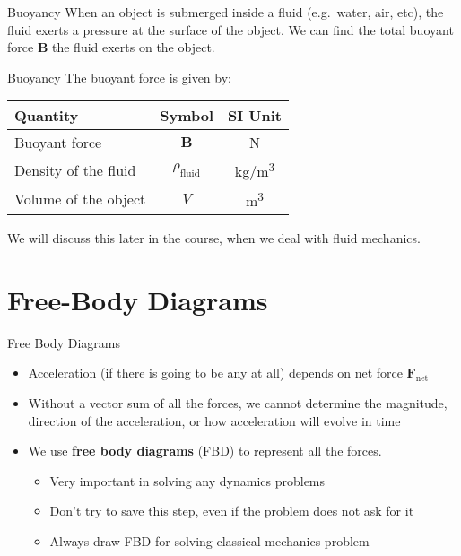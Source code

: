 \documentclass[12pt,compress,aspectratio=169]{beamer}
\begin{document}
\begin{frame}{Buoyancy}
  When an object is submerged inside a fluid (e.g.\ water, air, etc), the fluid
  exerts a pressure at the surface of the object. We can find the total buoyant 
  force $\bm{B}$ the fluid exerts on the object.
  \begin{center}
  \end{center}
\end{frame}



\begin{frame}{Buoyancy}
  The buoyant force is given by:
  
  \begin{center}
    \begin{tabular}{l|c|c}
      \rowcolor{pink}
      \textbf{Quantity} & \textbf{Symbol} & \textbf{SI Unit} \\ \hline
      Buoyant force & $\bm{B}$  & \si{\newton} \\
      Density of the fluid & $\rho_\text{fluid}$ & \si{\kg/\m\cubed}\\
      Volume of the object & $V$ & \si{\metre\cubed}
    \end{tabular}
  \end{center}
  We will discuss this later in the course, when we deal with fluid mechanics.
\end{frame}



\section{Free-Body Diagrams}


\begin{frame}{Free Body Diagrams}
  \begin{itemize}
  \item Acceleration (if there is going to be any at all) depends
    on net force $\bm{F}_\text{net}$
  \item Without a vector sum of all the forces, we cannot determine the
    magnitude, direction of the acceleration, or how acceleration will evolve
    in time
  \item We use \textbf{free body diagrams} (FBD) to represent all the forces.
    \begin{itemize}
    \item Very important in solving any dynamics problems
    \item Don't try to save this step, even if the problem does not ask for it
    \item Always draw FBD for solving classical mechanics problem
    \end{itemize}
  \end{itemize}
\end{frame}
\end{document}
